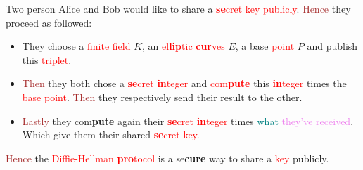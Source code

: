 \begin{itemize}
            Two person Alice and Bob would like to share a \textcolor{red}{\textbf{se}cret key
                publicly}. \textcolor{brown}{Hence} they
            proceed as followed:
            \begin{itemize}
                \item They choose a \textcolor{red}{finite field} $K$, an
                    \textcolor{red}{el\textbf{lip}tic \textbf{cur}ves} $E$, a base
                    \textcolor{red}{point} $P$ and publish this \textcolor{red}{triplet}.
                \item \textcolor{brown}{Then} they both chose a \textcolor{red}{\textbf{se}cret \textbf{in}teger} and
                    \textcolor{red}{com\textbf{pute}} this \textcolor{red}{\textbf{in}teger} times
                    the \textcolor{red}{base point}. \textcolor{brown}{Then} they respectively send their
                    result to the other.
                \item \textcolor{brown}{Lastly} they com\textbf{pute} again their \textcolor{red}{\textbf{se}cret
                    \textbf{in}teger} times \textcolor{teal}{what} \textcolor{violet}{they've
                    received}. Which give them their shared \textcolor{red}{\textbf{se}cret key}.
            \end{itemize}

            \textcolor{brown}{Hence} the \textcolor{red}{Diffie-Hellman \textbf{pro}tocol} is a se\textbf{cure} way to share a
            \textcolor{red}{key} publicly.


\end{itemize}
